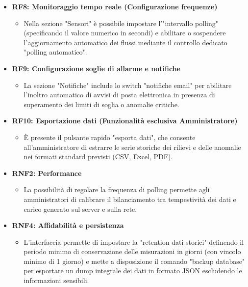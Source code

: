 \begin{itemize}
    \item \textbf{RF8: Monitoraggio tempo reale (Configurazione frequenze)}
    \begin{itemize}
        \item Nella sezione "Sensori" è possibile impostare l'"intervallo polling" (specificando il valore numerico in secondi) e abilitare o sospendere l'aggiornamento automatico dei flussi mediante il controllo dedicato "polling automatico".
    \end{itemize}

    \item \textbf{RF9: Configurazione soglie di allarme e notifiche}
    \begin{itemize}
        \item La sezione "Notifiche" include lo switch "notifiche email" per abilitare l'inoltro automatico di avvisi di posta elettronica in presenza di superamento dei limiti di soglia o anomalie critiche.
    \end{itemize}

    \item \textbf{RF10: Esportazione dati (Funzionalità esclusiva Amministratore)}
    \begin{itemize}
        \item È presente il pulsante rapido "esporta dati", che consente all'amministratore di estrarre le serie storiche dei rilievi e delle anomalie nei formati standard previsti (CSV, Excel, PDF).
    \end{itemize}
    
    \item \textbf{RNF2: Performance}
    \begin{itemize}
        \item La possibilità di regolare la frequenza di polling permette agli amministratori di calibrare il bilanciamento tra tempestività dei dati e carico generato sul server e sulla rete.
    \end{itemize}
    \newpage
    \item \textbf{RNF4: Affidabilità e persistenza}
    \begin{itemize}
        \item L'interfaccia permette di impostare la "retention dati storici" definendo il periodo minimo di conservazione delle misurazioni in giorni (con vincolo minimo di 1 giorno) e mette a disposizione il comando "backup database" per esportare un dump integrale dei dati in formato JSON escludendo le informazioni sensibili.
    \end{itemize}

\end{itemize}